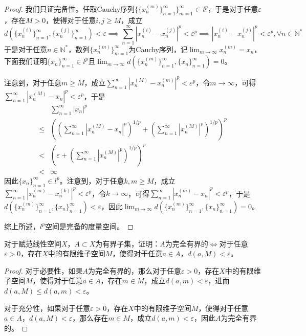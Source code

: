 \documentclass[lang = cn, scheme = chinese, 10pt]{elegantbook}
\newcommand{\N}{\mathbb{N}}  %
\newcommand{\sub}{\subset}   %
\begin{document}
\begin{proof}
	我们只证完备性。任取Cauchy序列$\{ \{x_n^{(m)}\}_{n=1}^\infty \}_{m=1}^\infty\sub l^p$，于是对于任意$\varepsilon$，存在$M>0$，使得对于任意$i,j\ge M$，成立
	$$
	d(\{x_n^{(i)}\}_{n=1}^\infty,\{x_n^{(j)}\}_{n=1}^\infty)<\varepsilon
	\implies \sum_{n=1}^{\infty}|x_n^{(i)}-x_n^{(j)}|^p<\varepsilon^p
	\implies |x_n^{(i)}-x_n^{(j)}|^p<\varepsilon^p,\forall n\in\N^*
	$$
	于是对于任意$n\in\N^*$，数列$\{x_n^{(m)}\}_{m=1}^{\infty}$为Cauchy序列，记$\displaystyle \lim_{m\to\infty} x_n^{(m)}=x_n$，下面我们证明$\{x_n\}_{n=1}^{\infty}\in l^p$且$\displaystyle \lim_{m\to\infty}d(\{x_n^{(m)}\}_{n=1}^\infty,\{x_n\}_{n=1}^\infty)=0$。
	
	注意到，对于任意$m\ge M$，成立$\displaystyle\sum_{n=1}^{\infty}|x_n^{(M)}-x_n^{(m)}|^p<\varepsilon^p$，令$m\to\infty$，可得$\displaystyle\sum_{n=1}^{\infty}|x_n^{(M)}-x_n|^p<\varepsilon^p$，于是
	\nonumber\begin{align}
		&\sum_{n=1}^{\infty}|x_n|^p\\
		\le&\left( \left(\sum_{n=1}^{\infty}|x_n^{(M)}-x_n|^p\right)^{1/p}+\left(\sum_{n=1}^{\infty}|x_n^{(M)}|^p\right)^{1/p} \right)^p\\
		<&\left( \varepsilon+\left(\sum_{n=1}^{\infty}|x_n^{(M)}|^p\right)^{1/p} \right)^p\\
		<&\infty
	\end{align}
	因此$\{x_n\}_{n=1}^{\infty}\in l^p$。注意到，对于任意$k,m\ge M$，成立$\displaystyle\sum_{n=1}^{\infty}|x_n^{(m)}-x_n^{(k)}|^p<\varepsilon^p$，令$k\to\infty$，可得$\displaystyle\sum_{n=1}^{\infty}|x_n^{(m)}-x_n|^p<\varepsilon^p$，于是$d(\{x_n^{(m)}\}_{n=1}^\infty,\{x_n\}_{n=1}^\infty)<\varepsilon$，因此$\displaystyle \lim_{m\to\infty}d(\{x_n^{(m)}\}_{n=1}^\infty,\{x_n\}_{n=1}^\infty)=0$。
	
	综上所述，$l^p$空间是完备的度量空间。
\end{proof}

\begin{proposition}
	对于赋范线性空间$X$，$A\sub X$为有界子集，证明：$A$为完全有界的$\iff$对于任意$\varepsilon>0$，存在$X$中的有限维子空间$M$，使得对于任意$a\in A$，$d(a,M)<\varepsilon$。
\end{proposition}

\begin{proof}
	对于必要性，如果$A$为完全有界的，那么对于任意$\varepsilon>0$，存在$X$中的有限维子空间$M$，使得对于任意$a\in A$，存在$m\in M$，成立$d(a,m)<\varepsilon$，进而$d(a,M)\le d(a,m)<\varepsilon$。
	
	对于充分性，如果对于任意$\varepsilon>0$，存在$X$中的有限维子空间$M$，使得对于任意$a\in A$，$d(a,M)<\varepsilon$，那么存在$m\in M$，成立$d(a,m)<\varepsilon$，因此$A$为完全有界的。
\end{proof}
\end{document}
